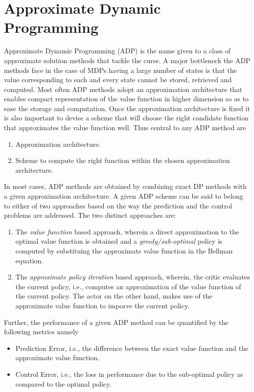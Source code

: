 \section{Approximate Dynamic Programming}
Approximate Dynamic Programming (ADP) is the name given to a class of approximate solution methods that tackle the curse. 
A major bottleneck the ADP methods face in the case of MDPs having a large number of states is that the value corresponding to each and every state cannot be stored, retrieved and computed. Most often ADP methods adopt an approximation architecture that enables compact representation of the value function in higher dimension so as to ease the storage and computation. Once the approximation architecture is fixed it is also important to devise a scheme that will choose the right candidate function that approximates the value function well. Thus central to any ADP method are
\begin{enumerate}
\item Approximation architecture.
\item Scheme to compute the right function within the chosen approximation architecture.
\end{enumerate}
In most cases, ADP methods are obtained by combining exact DP methods with a given approximation architecture. A given ADP scheme can be said to belong to either of two approaches based on the way the prediction and the control problems are addressed. The two distinct approaches are:
\begin{enumerate}
\item The \emph{value function} based approach, wherein a direct approximation to the optimal value function is obtained and a \emph{greedy/sub-optimal} policy is computed by substituing the approximate value function in the Bellman equation.
\item The \emph{approximate policy iteration} based approach, wherein, the critic evaluates the current policy, i.e., computes an approximation of the value function of the current policy. The actor on the other hand, makes use of the approximate value function to imporve the current policy.
\end{enumerate}
 Further, the performance of a given ADP method can be quantified by the following metrics namely
\begin{itemize}
\item Prediction Error, i.e., the difference between the exact value function and the approximate value function.
\item Control Error, i.e., the loss in performance due to the sub-optimal policy as compared to the optimal policy.
\end{itemize}
